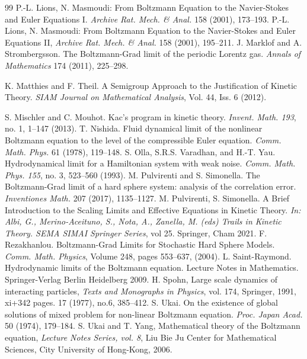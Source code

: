 \documentclass[10pt, reqno]{amsart}
\theoremstyle{definition}
\theoremstyle{remark}
\numberwithin{equation}{section}
\begin{document}
\begin{thebibliography}{99}
 P.-L. Lions, N. Masmoudi: From Boltzmann Equation to the Navier-Stokes and Euler Equations I. \emph{Archive Rat. Mech. \& Anal.} 158 (2001), 173--193.
 P.-L. Lions, N. Masmoudi: From Boltzmann Equation to the Navier-Stokes and Euler Equations II, \emph{Archive Rat. Mech. \& Anal.} 158 (2001), 195--211.
 J. Marklof and A.  Strombergsson. The Boltzmann-Grad limit of the periodic Lorentz gas. \emph{Annals of Mathematics} 174 (2011), 225--298.

 K. Matthies and F. Theil. A Semigroup Approach to the Justification of Kinetic Theory. \emph{SIAM Journal on Mathematical Analysis}, Vol. 44, Iss. 6 (2012).

 S. Mischler and C. Mouhot. Kac's program in kinetic theory. \emph{Invent. Math. 193}, no. 1, 1--147 (2013).
 T. Nishida. Fluid dynamical limit of the nonlinear Boltzmann equation to the level of the compressible Euler equation. \emph{Comm. Math. Phys.} 61 (1978), 119--148.
 S. Olla, S.R.S. Varadhan, and H.-T. Yau. Hydrodynamical limit for a Hamiltonian system with weak noise. \emph{Comm. Math. Phys. 155}, no. 3, 523--560 (1993).
 M. Pulvirenti and S. Simonella. The Boltzmann-Grad limit of a hard sphere system: analysis of the correlation error. \emph{Inventiones Math.} 207 (2017), 1135--1127.
 M. Pulvirenti, S. Simonella. A Brief Introduction to the Scaling Limits and Effective Equations in Kinetic Theory. \emph{In: Albi, G., Merino-Aceituno, S., Nota, A., Zanella, M. (eds) Trails in Kinetic Theory. SEMA SIMAI Springer Series}, vol 25. Springer, Cham 2021.
 F. Rezakhanlou. Boltzmann-Grad Limits for Stochastic Hard Sphere Models. \emph{Comm. Math. Physics}, Volume 248, pages 553--637, (2004).
 L. Saint-Raymond. Hydrodynamic limits of the Boltzmann equation. Lecture Notes in Mathematics. Springer-Verlag Berlin Heidelberg 2009.
 H. Spohn, Large scale dynamics of interacting particles, \emph{Texts and Monographs in Physics}, vol. 174, Springer, 1991, xi+342 pages.  
17 (1977), no.6, 385--412.
 S. Ukai. On the existence of global solutions of mixed problem for non-linear Boltzmann equation. \emph{Proc. Japan Acad.} 50 (1974), 179--184. 
 S. Ukai and T. Yang, Mathematical theory of the Boltzmann equation, \emph{Lecture Notes Series, vol. 8}, Liu Bie Ju Center for Mathematical Sciences, City University of
Hong-Kong, 2006.
\end{thebibliography}
\end{document}
